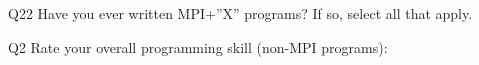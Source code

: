 \begin{description}%
\item{Q22} Have you ever written MPI+”X” programs? If so, select all that apply.%
\item{Q2} Rate your overall programming skill (non-MPI programs):%
\end{description}%
